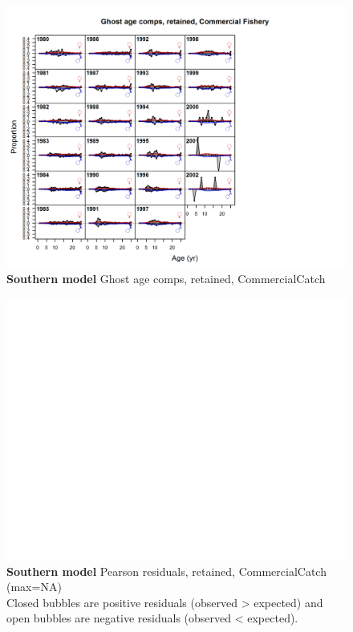 \documentclass[12pt,]{article}
\begin{document}
\begin{figure}[htbp]
\centering
\includegraphics{./r4ss/plots_mod2/comp_gstagefit_flt2mkt2.png}
\caption{\textbf{Southern model} Ghost age comps, retained,
CommercialCatch \label{fig:mod2_14_comp_gstagefit_flt2mkt2}}
\end{figure}

\begin{figure}[htbp]
\centering
\includegraphics{./r4ss/plots_mod2/comp_gstagefit_residsflt2mkt2.png}
\caption{\textbf{Southern model} Pearson residuals, retained,
CommercialCatch (max=NA)\\
Closed bubbles are positive residuals (observed \textgreater{} expected)
and open bubbles are negative residuals (observed \textless{} expected).
\label{fig:mod2_15_comp_gstagefit_residsflt2mkt2}}
\end{figure}
\end{document}
